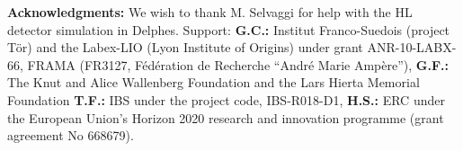 \textbf{Acknowledgments:} We wish to thank M. Selvaggi for help with the HL detector simulation in Delphes. Support: \textbf{G.C.:} Institut Franco-Suedois (project T{\"o}r) and  
the Labex-LIO (Lyon Institute of Origins) under grant ANR-10-LABX-66, FRAMA (FR3127,
F\'ed\'eration de Recherche ``Andr\'e Marie Amp\`ere''), \textbf{G.F.:} The Knut and Alice Wallenberg Foundation and the Lars Hierta Memorial Foundation \textbf{T.F.:} IBS under the project code, IBS-R018-D1, \textbf{H.S.:} ERC under the European Union's Horizon 2020 research and innovation programme (grant agreement No 668679).